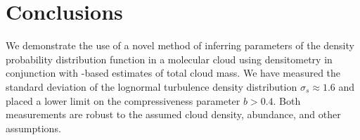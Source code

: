 % 



\section{Conclusions}
We demonstrate the use of a novel method of inferring parameters of the density
probability distribution function in a molecular cloud using \formaldehyde densitometry
in conjunction with \thirteenco-based estimates of total cloud mass.  We have
measured the standard deviation of the lognormal turbulence density distribution $\sigma_s
\approx 1.6$ and placed a lower limit on the compressiveness parameter $b>0.4$.
Both measurements are robust to the assumed cloud density, \formaldehyde
abundance, and other assumptions.

